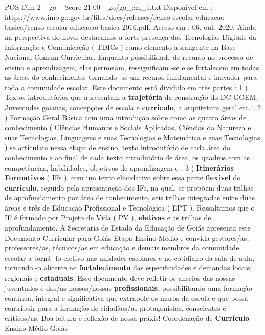 \begin{textsample}{POS Dim 2 – go – Score 21.00 – go/go\_em\_1.txt}
Disponível em : https://www.imb.go.gov.br/files/docs/releases/censo-escolar-educacao-basica/censo-escolar-educacao-basica-2016.pdf.
Acesso em : 06. out. 2020.
Ainda na perspectiva do novo, destacamos a forte presença das Tecnologias Digitais da Informação e Comunicação ( TDICs ) como elemento abrangente na Base Nacional Comum Curricular.
Enquanto possibilidade de recurso no processo de ensino e aprendizagem, elas permeiam, ressignificam -se e se fortalecem em todas as áreas do conhecimento, tornando -se um recurso fundamental e inovador para toda a comunidade escolar.
Este documento está dividido em três partes : 1 ) Textos introdutórios que apresentam a \textbf{trajetória} da construção do DC-GOEM, Juventudes goianas, concepções de escola e \textbf{currículo}, a arquitetura geral etc. ; 2 ) Formação Geral Básica com uma introdução sobre como as quatro áreas de conhecimento ( Ciências Humanas e Sociais Aplicadas, Ciências da Natureza e suas Tecnologias, Linguagens e suas Tecnologias e Matemática e suas Tecnologias ) se articulam nessa etapa de ensino, texto introdutório de cada área do conhecimento e ao final de cada texto introdutório de área, os quadros com as competências, habilidades, objetivos de aprendizagem e ; 3 ) \textbf{Itinerários} \textbf{Formativos} ( IFs ), com um texto elucidativo sobre essa parte \textbf{flexível} do \textbf{currículo}, seguido pela apresentação dos IFs, na qual, se propõem duas trilhas de aprofundamento por área de conhecimento, seis trilhas integradas entre duas áreas e três de Educação Profissional e Tecnológica ( EPT ).
Ressaltamos que o IF é formado por Projeto de Vida ( PV ), \textbf{eletivas} e as trilhas de aprofundamento.
A Secretaria de Estado da Educação de Goiás apresenta este Documento Curricular para Goiás Etapa Ensino Médio e convida gestores/as, professores/as, técnicos/as em educação e demais membros da comunidade escolar a torná -lo efetivo nas unidades escolares e no cotidiano da sala de aula, tornando -o alicerce no \textbf{fortalecimento} das especificidades e demandas locais, regionais e \textbf{estaduais}.
Esse documento deve refletir os anseios das nossas juventudes e dos/as nossos/nossas \textbf{profissionais}, possibilitando uma formação contínua, integral e significativa que extrapole os muros da escola e que possa contribuir para a formação de cidadãos/as protagonistas, conscientes e críticos/as.
Boa leitura e reflexão de nossa práxis!
Coordenação de \textbf{Currículo} - Ensino Médio Goiás

\end{textsample}
